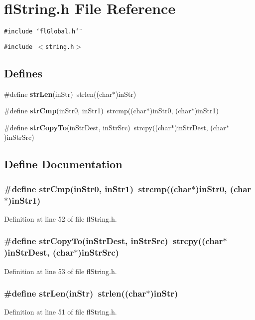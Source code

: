 \section{fl\-String.h File Reference}
\label{flString_8h}
{\tt \#include \char`\"{}fl\-Global.h\char`\"{}}\par
{\tt \#include $<$string.h$>$}\par
\subsection*{Defines}
\begin{CompactItemize}
\item 
\#define {\bf str\-Len}(in\-Str)~strlen((char$\ast$)in\-Str)
\item 
\#define {\bf str\-Cmp}(in\-Str0, in\-Str1)~strcmp((char$\ast$)in\-Str0, (char$\ast$)in\-Str1)
\item 
\#define {\bf str\-Copy\-To}(in\-Str\-Dest, in\-Str\-Src)~strcpy((char$\ast$)in\-Str\-Dest, (char$\ast$)in\-Str\-Src)
\end{CompactItemize}


\subsection{Define Documentation}
\subsubsection{\setlength{\rightskip}{0pt plus 5cm}\#define str\-Cmp(in\-Str0, in\-Str1)~strcmp((char$\ast$)in\-Str0, (char$\ast$)in\-Str1)}\label{flString_8h_bee7b0fe486b884d72973e5ef60dc5e3}




Definition at line 52 of file fl\-String.h.
\subsubsection{\setlength{\rightskip}{0pt plus 5cm}\#define str\-Copy\-To(in\-Str\-Dest, in\-Str\-Src)~strcpy((char$\ast$)in\-Str\-Dest, (char$\ast$)in\-Str\-Src)}\label{flString_8h_5c2b36962357fe60978ba566fcf2c9a6}




Definition at line 53 of file fl\-String.h.
\subsubsection{\setlength{\rightskip}{0pt plus 5cm}\#define str\-Len(in\-Str)~strlen((char$\ast$)in\-Str)}\label{flString_8h_e03b574ce58120e77b17c8e5f1c247f1}




Definition at line 51 of file fl\-String.h.